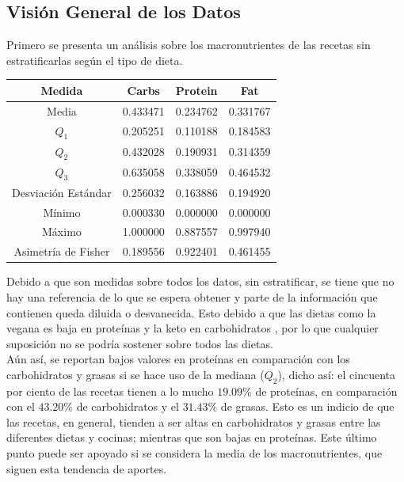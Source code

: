 \documentclass[12pt,a4paper]{article}
\begin{document}
    \subsection{Visión General de los Datos}
        Primero se presenta un análisis sobre los macronutrientes de 
        las recetas sin estratificarlas según el tipo de dieta.

        \begin{center}
            \begin{tabular}{| c | c c c |}
                \toprule
                Medida & Carbs & Protein & Fat \\
                \midrule
                Media               & 0.433471 & 0.234762 & 0.331767 \\
                $Q_1$               & 0.205251 & 0.110188 & 0.184583 \\
                $Q_2$               & 0.432028 & 0.190931 & 0.314359 \\
                $Q_3$               & 0.635058 & 0.338059 & 0.464532 \\
                Desviación Estándar & 0.256032 & 0.163886 & 0.194920 \\
                Mínimo              & 0.000330 & 0.000000 & 0.000000 \\
                Máximo              & 1.000000 & 0.887557 & 0.997940 \\
                Asimetría de Fisher & 0.189556 & 0.922401 & 0.461455 \\
                \bottomrule
            \end{tabular}
        \end{center}

        Debido a que son medidas sobre todos los datos, sin estratificar, 
        se tiene que no hay una referencia de lo que se espera obtener y 
        parte de la información que contienen queda diluida o desvanecida. 
        Esto debido a que las dietas como la vegana es baja en proteínas y 
        la keto en carbohidratos \cite{marvastipopular}, por lo que cualquier 
        suposición no se podría sostener sobre todos las dietas.\\

        Aún así, se reportan bajos valores en proteínas en comparación 
        con los carbohidratos y grasas si se hace uso de la mediana ($Q_2$), 
        dicho así: el cincuenta por ciento de las recetas tienen a lo mucho  
        $19.09\%$ de proteínas, en comparación con el $43.20\%$ de carbohidratos 
        y el $31.43\%$ de grasas. Esto es un indicio de que las recetas, en general, 
        tienden a ser altas en carbohidratos y grasas entre las diferentes dietas y 
        cocinas; mientras que son bajas en proteínas. Este último punto puede ser 
        apoyado si se considera la media de los macronutrientes, que siguen esta 
        tendencia de aportes.\\
\end{document}
